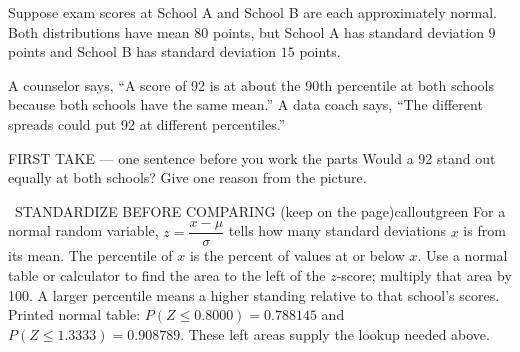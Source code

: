 \documentclass[11pt]{article}
\begin{document}
Suppose exam scores at School A and School B are each approximately normal. Both distributions have mean $80$ points, but School A has standard deviation $9$ points and School B has standard deviation $15$ points.\par\smallskip A counselor says, ``A score of 92 is at about the 90th percentile at both schools because both schools have the same mean.'' A data coach says, ``The different spreads could put 92 at different percentiles.''\par
\begin{center}
\end{center}
\begin{firsttakebox}{FIRST TAKE --- one sentence before you work the parts}
Would a 92 stand out equally at both schools? Give one reason from the picture.\par
{}
\end{firsttakebox}

\begin{callout}{\IconBook\ STANDARDIZE BEFORE COMPARING (keep on the page)}{calloutgreen}
For a normal random variable, $z=\dfrac{x-\mu}{\sigma}$ tells how many standard deviations $x$ is from its mean.
The percentile of $x$ is the percent of values at or below $x$.
Use a normal table or calculator to find the area to the left of the $z$-score; multiply that area by 100.
A larger percentile means a higher standing relative to that school's scores.
Printed normal table: $P(Z\leq0.8000)=0.788145$ and $P(Z\leq1.3333)=0.908789$. These left areas supply the lookup needed above.
\end{callout}
\end{document}
